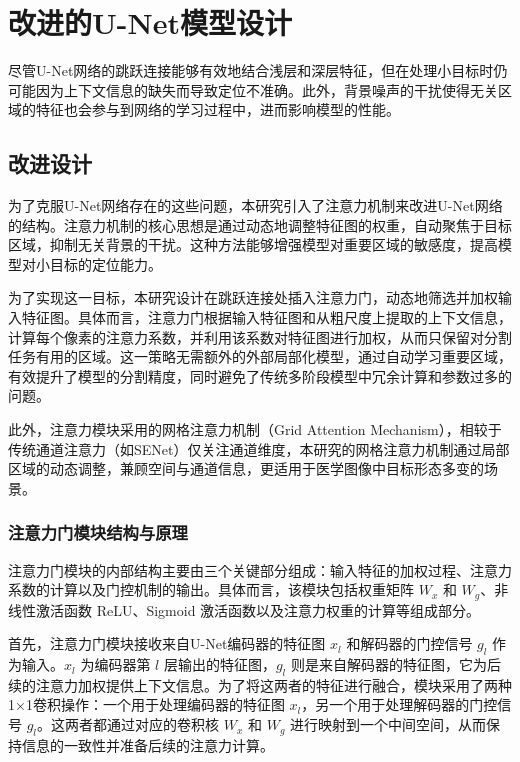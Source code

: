 \section{改进的U-Net模型设计}

尽管U-Net网络的跳跃连接能够有效地结合浅层和深层特征，但在处理小目标时仍可能因为上下文信息的缺失而导致定位不准确。此外，背景噪声的干扰使得无关区域的特征也会参与到网络的学习过程中，进而影响模型的性能。

\subsection{改进设计}

为了克服U-Net网络存在的这些问题，本研究引入了注意力机制来改进U-Net网络的结构。注意力机制的核心思想是通过动态地调整特征图的权重，自动聚焦于目标区域，抑制无关背景的干扰。这种方法能够增强模型对重要区域的敏感度，提高模型对小目标的定位能力。

为了实现这一目标，本研究设计在跳跃连接处插入注意力门，动态地筛选并加权输入特征图。具体而言，注意力门根据输入特征图和从粗尺度上提取的上下文信息，计算每个像素的注意力系数，并利用该系数对特征图进行加权，从而只保留对分割任务有用的区域。这一策略无需额外的外部局部化模型，通过自动学习重要区域，有效提升了模型的分割精度，同时避免了传统多阶段模型中冗余计算和参数过多的问题。

此外，注意力模块采用的网格注意力机制（Grid Attention Mechanism），相较于传统通道注意力（如SENet）仅关注通道维度，本研究的网格注意力机制通过局部区域的动态调整，兼顾空间与通道信息，更适用于医学图像中目标形态多变的场景。

\subsubsection{注意力门模块结构与原理}

注意力门模块的内部结构主要由三个关键部分组成：输入特征的加权过程、注意力系数的计算以及门控机制的输出。具体而言，该模块包括权重矩阵 $W_x$ 和 $W_g$、非线性激活函数 ReLU、Sigmoid 激活函数以及注意力权重的计算等组成部分。

首先，注意力门模块接收来自U-Net编码器的特征图 $x_l$ 和解码器的门控信号 $g_l$ 作为输入。$x_l$ 为编码器第 $l$ 层输出的特征图，$g_l$ 则是来自解码器的特征图，它为后续的注意力加权提供上下文信息。为了将这两者的特征进行融合，模块采用了两种1×1卷积操作：一个用于处理编码器的特征图 $x_l$，另一个用于处理解码器的门控信号 $g_l$。这两者都通过对应的卷积核 $W_x$ 和 $W_g$ 进行映射到一个中间空间，从而保持信息的一致性并准备后续的注意力计算。

